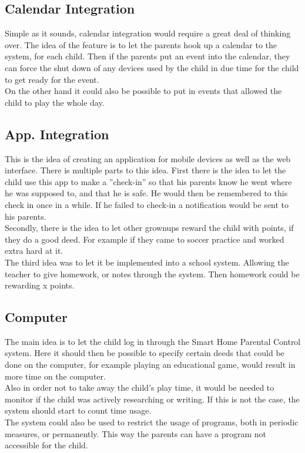\subsection{Calendar Integration}
Simple as it sounds, calendar integration would require a great deal of thinking over. The idea of the feature is to let the parents hook up a calendar to the system, for each child. Then if the parents put an event into the calendar, they can force the shut down of any devices used by the child in due time for the child to get ready for the event.\\
On the other hand it could also be possible to put in events that allowed the child to play the whole day.

\subsection{App. Integration}
This is the idea of creating an application for mobile devices as well as the web interface.
There is multiple parts to this idea. First there is the idea to let the child use this app to make a ''check-in'' so that his parents know he went where he was supposed to, and that he is safe. He would then be remembered to this check in once in a while. If he failed to check-in a notification would be sent to his parents.\\
Secondly, there is the idea to let other grownups reward the child with points, if they do a good deed. For example if they came to soccer practice and worked extra hard at it.\\
The third idea was to let it be implemented into a school system. Allowing the teacher to give homework, or notes through the system. Then homework could be rewarding x points.

\subsection{Computer}
The main idea is to let the child log in through the Smart Home Parental Control system. Here it should then be possible to specify certain deeds that could be done on the computer, for example playing an educational game, would result in more time on the computer.\\
Also in order not to take away the child's play time, it would be needed to monitor if the child was actively researching or writing. If this is not the case, the system should start to count time usage.\\
The system could also be used to restrict the usage of programs, both in periodic measures, or permanently. This way the parents can have a program not accessible for the child.

